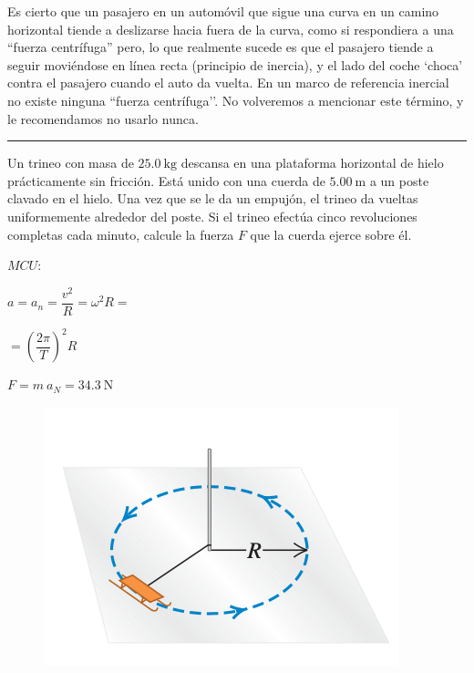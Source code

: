 \normalsize{Es} cierto que un pasajero en un automóvil que sigue una curva en un camino horizontal tiende a deslizarse hacia fuera de la curva, como si respondiera a una “fuerza centrífuga” pero, lo que realmente sucede es que el pasajero tiende a seguir moviéndose en línea recta (principio de inercia), y el lado del coche `choca’ contra el pasajero cuando el auto da vuelta. En un marco de referencia inercial no existe ninguna ``fuerza centrífuga’’. No volveremos a mencionar este término, y le recomendamos no usarlo nunca. 

\rule{150 pt}{0.4 pt}

\begin{prob}
Un trineo con masa de $25.0\ \mathrm{kg}$ descansa en una plataforma horizontal de hielo prácticamente sin fricción. Está unido con una cuerda de $5.00\ \mathrm{m}$ a un poste clavado en el hielo. Una vez que se le da un empujón, el trineo da vueltas uniformemente alrededor del poste. Si el trineo efectúa cinco revoluciones completas cada minuto, calcule la fuerza $F$ que la cuerda ejerce sobre él.	
\end{prob}
\begin{multicols}{2}
$MCU: $

$a=a_n=\dfrac {v^2}R=\omega^2 R = $

$=\left(\dfrac {2 \pi}{T}\right)^2 R $

$F=m \ a_N = 34.3 \ \mathrm{N}$
\begin{figure}[H]
	\centering
	\includegraphics[width=.3\textwidth]{imagenes/imagenes03/T03IM42.png}
	\end{figure}
\end{multicols}

